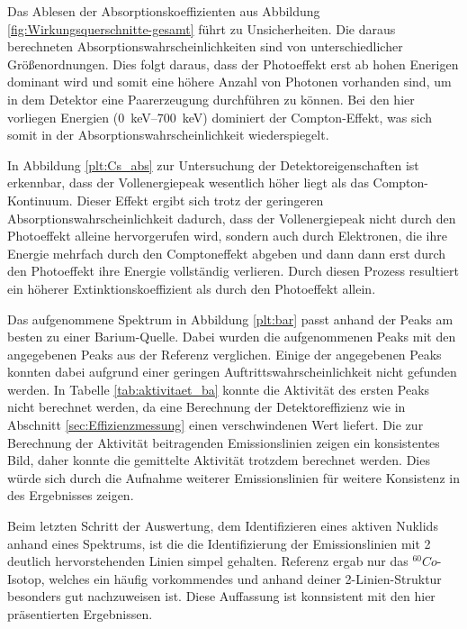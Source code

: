 Das Ablesen der Absorptionskoeffizienten aus Abbildung \ref{fig:Wirkungsquerschnitte-gesamt}
führt zu Unsicherheiten. Die daraus berechneten Absorptionswahrscheinlichkeiten
sind von unterschiedlicher Größenordnungen. Dies folgt daraus, dass der Photoeffekt
erst ab hohen Enerigen dominant wird und somit eine höhere Anzahl von Photonen vorhanden
sind, um in dem Detektor eine Paarerzeugung durchführen zu können. Bei den hier
vorliegen Energien (\SIrange{0}{700}{\kilo\electronvolt}) dominiert der Compton-Effekt,
was sich somit in der Absorptionswahrscheinlichkeit wiederspiegelt.

In Abbildung \ref{plt:Cs_abs} zur Untersuchung der Detektoreigenschaften ist erkennbar,
dass der Vollenergiepeak wesentlich höher liegt als
das Compton-Kontinuum. Dieser Effekt ergibt sich trotz der geringeren
Absorptionswahrscheinlichkeit dadurch, dass der Vollenergiepeak nicht durch den
Photoeffekt alleine hervorgerufen wird, sondern auch durch Elektronen, die ihre
Energie mehrfach durch den Comptoneffekt abgeben und dann dann erst durch den
Photoeffekt ihre Energie vollständig verlieren. Durch diesen Prozess resultiert
ein höherer Extinktionskoeffizient als durch den Photoeffekt allein.

Das aufgenommene Spektrum in Abbildung \ref{plt:bar} passt anhand der Peaks am besten
zu einer Barium-Quelle. Dabei wurden die aufgenommenen Peaks mit den angegebenen Peaks
aus der Referenz \cite{referenz} verglichen. Einige der angegebenen Peaks konnten
dabei aufgrund einer geringen Auftrittswahrscheinlichkeit nicht gefunden werden.
In Tabelle \ref{tab:aktivitaet_ba} konnte die Aktivität des ersten Peaks nicht
berechnet werden, da eine Berechnung der Detektoreffizienz wie in Abschnitt \ref{sec:Effizienzmessung}
einen verschwindenen Wert liefert. Die zur Berechnung der Aktivität beitragenden
Emissionslinien zeigen ein konsistentes Bild, daher konnte die gemittelte Aktivität
trotzdem berechnet werden. Dies würde sich durch die Aufnahme weiterer Emissionslinien
für weitere Konsistenz in des Ergebnisses zeigen.

Beim letzten Schritt der Auswertung, dem Identifizieren eines aktiven Nuklids
anhand eines Spektrums, ist die die Identifizierung der Emissionslinien mit 2
deutlich hervorstehenden Linien simpel gehalten. Referenz \cite{referenz} ergab
nur das $^{60}Co$-Isotop, welches ein häufig vorkommendes und anhand deiner 2-Linien-Struktur
besonders gut nachzuweisen ist. Diese Auffassung ist konnsistent mit den hier
präsentierten Ergebnissen.
